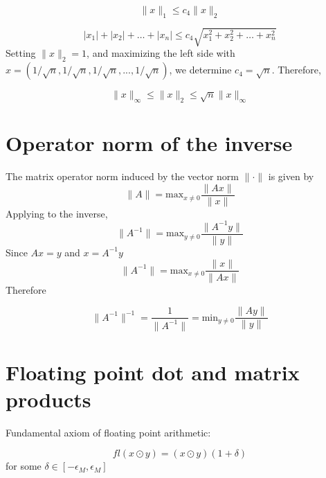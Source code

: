 \documentclass[11pt]{article} %
\begin{document}
\begin{equation}
\| x \|_1 \le c_4 \|x \|_2
\end{equation}

\begin{equation}
|x_1| + |x_2| + \hdots + |x_n| \le c_4 \sqrt{x_1^2 + x_2^2 + \hdots + x_n^2} 
\end{equation}
Setting $\| x \|_2 =1$, and maximizing the left side with $x = (1/\sqrt{n}, 1/\sqrt{n} ,1/\sqrt{n}, ..., 1/\sqrt{n})$, we determine $c_4 = \sqrt{n}$. Therefore, 

\begin{equation}
\boxed{\| x \| _\infty \le \| x \|_2 \le \sqrt{n} \|x\|_\infty}
\end{equation}


\section{Operator norm of the inverse}
The matrix operator norm induced by the vector norm $\| \cdot \|$ is given by
\begin{equation}
\| A \| =\textrm{max}_{x\ne 0} \frac{\| Ax\|}{\|x\|}
\end{equation}
Applying to the inverse,
\begin{equation}
\| A^{-1} \| =\textrm{max}_{y \ne 0} \frac{\| A^{-1}y\|}{\|y\|}
\end{equation}
Since $A x = y$ and $ x  =A^{-1} y$
\begin{equation}
\| A^{-1} \| =\textrm{max}_{x\ne 0} \frac{\|x\|}{\|A x\|}
\end{equation}
Therefore

\begin{equation}
\boxed{\| A^{-1} \|^{-1} = \frac{1}{\| A^{-1} \| } = \textrm{min}_{y \ne 0} \frac{\| A y\|}{\|y\|}}
\end{equation}
\section{Floating point dot and matrix products}

Fundamental axiom of floating point arithmetic:

\begin{equation}
fl(x \odot y) = (x \odot y)(1+\delta)
\label{eq:fp}
\end{equation}
for some $\delta \in [-\epsilon_M, \epsilon_M] $
\subsection{} %
\end{document}
